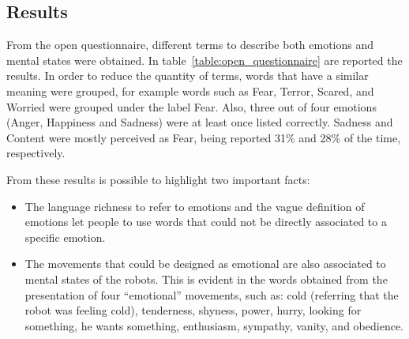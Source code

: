 \subsection{Results}

From the open questionnaire, different terms to describe both emotions and mental states were obtained. In table~\ref{table:open_questionnaire} are reported the results. In order to reduce the quantity of terms, words that have a similar meaning were grouped, for example words such as Fear, Terror, Scared, and Worried were grouped under the label Fear. Also, three out of four emotions (Anger, Happiness and Sadness) were at least once listed correctly. Sadness and Content were mostly perceived as Fear, being reported 31\% and 28\% of the time, respectively.

From these results is possible to highlight two important facts:

\begin{itemize}
	
	\item The language richness to refer to emotions and the vague definition of emotions let people to use words that could not be directly associated to a specific emotion. 
	
	\item The movements that could be designed as emotional are also associated to mental states of the robots. This is evident in the words obtained from the presentation of four ``emotional'' movements, such as: cold (referring that the robot was feeling cold), tenderness, shyness, power, hurry, looking for something, he wants something, enthusiasm, sympathy, vanity, and obedience. 
	
\end{itemize}

